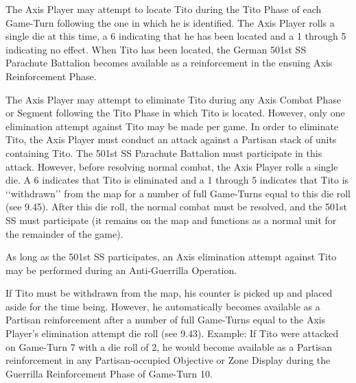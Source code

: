  The Axis Player may attempt to locate Tito during the Tito Phase of each Game-Turn following the one in which he is identified. The Axis Player rolls a single die at this time, a 6 indicating that he has been located and a 1 through 5 indicating no effect. When Tito has been located, the German 501st SS Parachute Battalion becomes available as a reinforcement in the ensuing Axis Reinforcement Phase.

 The Axis Player may attempt to eliminate Tito during any Axis Combat Phase or Segment following the Tito Phase in which Tito is located. However, only one elimination attempt against Tito may be made per game. In order to eliminate Tito, the Axis Player must conduct an attack against a Partisan stack of units containing Tito. The 501st SS Parachute Battalion must participate in this attack. However, before resolving normal combat, the Axis Player rolls a single die. A 6 indicates that Tito is eliminated and a 1 through 5 indicates that Tito is ‘‘withdrawn’’ from the map for a number of full Game-Turns equal to this die roll (see 9.45). After this die roll, the normal combat must be resolved, and the 501st SS must participate (it remains on the map and functions as a normal unit for the remainder of the game).

 As long as the 501st SS participates, an Axis elimination attempt against Tito may be performed during an Anti-Guerrilla Operation.

 If Tito must be withdrawn from the map, his counter is picked up and placed aside for the time being. However, he automatically becomes available as a Partisan reinforcement after a number of full Game-Turns equal to the Axis Player’s elimination attempt die roll (see 9.43). Example: If Tito were attacked on Game-Turn 7 with a die roll of 2, he would become available as a Partisan reinforcement in any Partisan-occupied Objective or Zone Display during the Guerrilla Reinforcement Phase of Game-Turn 10.
